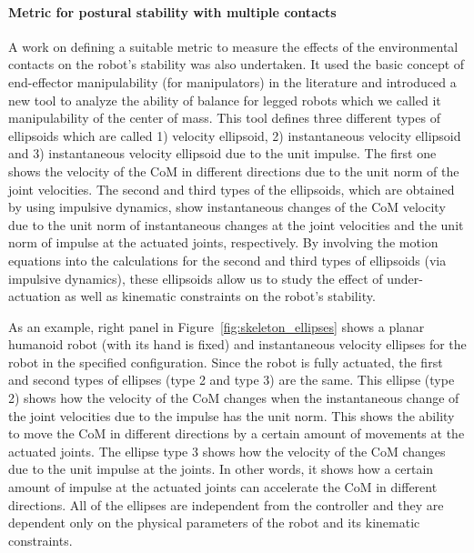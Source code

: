 \documentclass[final,5p,twocolumn]{elsarticle}
\begin{document}
\paragraph{Metric for postural stability with multiple contacts} A work on defining a suitable metric to measure the effects of the environmental contacts on the robot's stability was also undertaken.
It used the basic concept of end-effector manipulability (for manipulators)
in the literature and introduced a new tool to analyze the ability of balance
for legged robots which we called it manipulability of the center of mass.
This tool defines three different types of ellipsoids which are called 1)
velocity ellipsoid, 2) instantaneous velocity ellipsoid and 3) instantaneous
velocity ellipsoid due to the unit impulse.  The first one shows the velocity
of the CoM in different directions due to the unit norm of the joint
velocities.  The second and third types of the ellipsoids, which are obtained
by using impulsive dynamics, show instantaneous changes of the CoM velocity
due to the unit norm of instantaneous changes at the joint velocities and the
unit norm of impulse at the actuated joints, respectively.  By involving the
motion equations into the calculations for the second and third types of
ellipsoids (via impulsive dynamics), these ellipsoids allow us to study the
effect of under-actuation as well as kinematic constraints on the robot's
stability.

As an example, right panel in Figure~\ref{fig:skeleton_ellipses} shows a planar humanoid robot (with its hand is fixed) and instantaneous velocity ellipses for the robot in the specified configuration. Since the robot is fully actuated, the first and
second types of ellipses (type 2 and type 3) are the same. This ellipse (type
2) shows how the velocity of the CoM changes when the instantaneous change of
the joint velocities due to the impulse has the unit norm. This shows the
ability to move the CoM in different directions by a certain amount of
movements at the actuated joints. The ellipse type 3 shows how the velocity
of the CoM changes due to the unit impulse at the joints. In other words, it
shows how a certain amount of impulse at the actuated joints can accelerate
the CoM in different directions. All of the ellipses are independent from the
controller and they are dependent only on the physical parameters of the robot
and its kinematic constraints.
\end{document}
